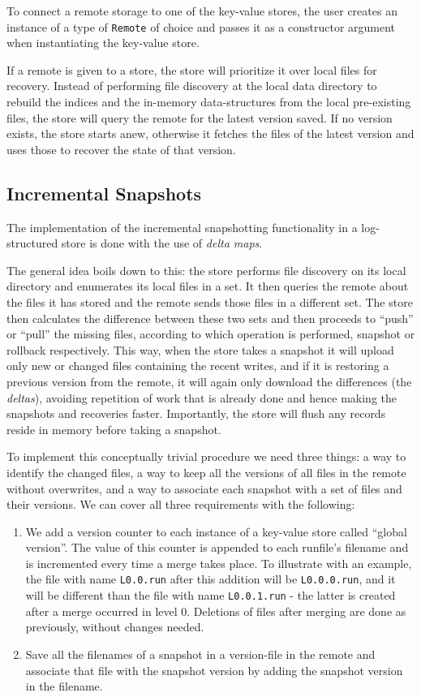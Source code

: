 To connect a remote storage to one of the key-value stores, the user creates an instance of a type of \verb|Remote| of choice and passes it as a constructor argument when instantiating the key-value store.

If a remote is given to a store, the store will prioritize it over local files for recovery. Instead of performing file discovery at the local data directory to rebuild the indices and the in-memory data-structures from the local pre-existing files, the store will query the remote for the latest version saved. If no version exists, the store starts anew, otherwise it fetches the files of the latest version and uses those to recover the state of that version.

\subsection{Incremental Snapshots}

The implementation of the incremental snapshotting functionality in a log-structured store is done with the use of \textit{delta maps}.

The general idea boils down to this: the store performs file discovery on its local directory and enumerates its local files in a set. It then queries the remote about the files it has stored and the remote sends those files in a different set. The store then calculates the difference between these two sets and then proceeds to ``push'' or ``pull'' the missing files, according to which operation is performed, snapshot or rollback respectively. This way, when the store takes a snapshot it will upload only new or changed files containing the recent writes, and if it is restoring a previous version from the remote, it will again only download the differences (the \textit{deltas}), avoiding repetition of work that is already done and hence making the snapshots and recoveries faster. Importantly, the store will flush any records reside in memory before taking a snapshot.

To implement this conceptually trivial procedure we need three things: a way to identify the changed files, a way to keep all the versions of all files in the remote without overwrites, and a way to associate each snapshot with a set of files and their versions. We can cover all three requirements with the following:

\begin{enumerate}
    \item We add a version counter to each instance of a key-value store called ``global version''. The value of this counter is appended to each runfile's filename and is incremented every time a merge takes place. To illustrate with an example, the file with name \verb|L0.0.run| after this addition will be \verb|L0.0.0.run|, and it will be different than the file with name \verb|L0.0.1.run| - the latter is created after a merge occurred in level 0. Deletions of files after merging are done as previously, without changes needed.
    \item Save all the filenames of a snapshot in a version-file in the remote and associate that file with the snapshot version by adding the snapshot version in the filename.
\end{enumerate}

